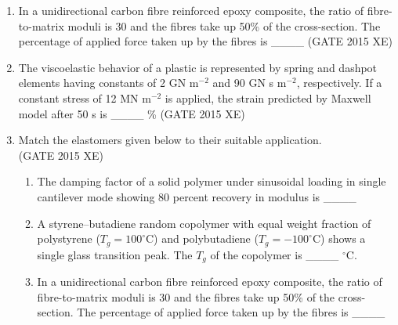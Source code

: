 \documentclass[journal,12pt,onecolumn]{IEEEtran}
\begin{document}
\begin{enumerate}
\begin{enumerate}
\begin{enumerate}
\item In a unidirectional carbon fibre reinforced epoxy composite, the ratio of fibre-to-matrix moduli is 30 and the fibres take up 50\% of the cross-section. The percentage of applied force taken up by the fibres is \_\_\_\_
\hfill{(GATE 2015 XE)} \\

\item The viscoelastic behavior of a plastic is represented by spring and dashpot elements having constants of 2 GN m$^{-2}$ and 90 GN s m$^{-2}$, respectively. If a constant stress of 12 MN m$^{-2}$ is applied, the strain predicted by Maxwell model after 50 s is \_\_\_\_ \%
\hfill{(GATE 2015 XE)} \\

\newpage

\item Match the elastomers given below to their suitable application.\\


\hfill{(GATE 2015 XE)}
\begin{multicols}{2}
\begin{enumerate}
=======

\vspace{0.5cm}

\item The damping factor of a solid polymer under sinusoidal loading in single cantilever mode showing 80 percent recovery in modulus is \_\_\_\_
\hfill{} \\
\vspace{0.5cm}

\item A styrene–butadiene random copolymer with equal weight fraction of polystyrene ($T_g=100^\circ$C) and polybutadiene ($T_g=-100^\circ$C) shows a single glass transition peak. The $T_g$ of the copolymer is \_\_\_\_ $^\circ$C.
\hfill{} \\
\vspace{0.5cm}

\item In a unidirectional carbon fibre reinforced epoxy composite, the ratio of fibre-to-matrix moduli is 30 and the fibres take up 50\% of the cross-section. The percentage of applied force taken up by the fibres is \_\_\_\_
\hfill{} \\

\vspace{0.5cm}


\end{enumerate}
\end{multicols}
\end{enumerate}
\end{enumerate}
\end{enumerate}
\end{document}
